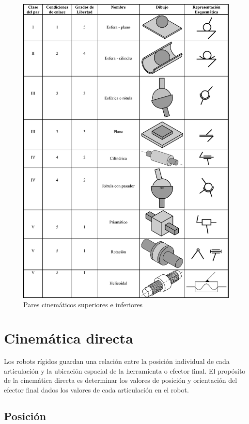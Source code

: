 \begin{figure}
	\centering
	\includegraphics[scale=1.0]{Capitulo2/figs/pares.png} 
	\caption{Pares cinemáticos superiores e inferiores}
	\label{pares}
\end{figure}

\section{Cinemática directa}

Los robots rígidos guardan una relación entre la posición individual de cada articulación y la ubicación espacial de la herramienta o efector final. El propósito de la cinemática directa es determinar los valores de posición y orientación del efector final dados los valores de cada articulación en el robot. 

\subsection{Posición}

